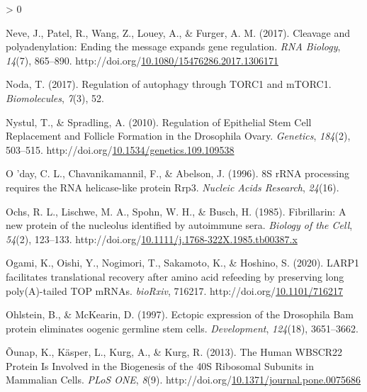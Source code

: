 \documentclass[12pt,oneside]{reedthesis}
\newlength{\cslhangindent}
\newenvironment{CSLReferences}[2] %
 {%
  \setlength{\parindent}{0pt}
  \ifodd #1 \everypar{\setlength{\hangindent}{\cslhangindent}}\ignorespaces\fi
  \ifnum #2 > 0
  \setlength{\parskip}{#2\baselineskip}
  \fi
 }%
 {}
\begin{document}
\begin{CSLReferences}{1}{0}
\leavevmode\hypertarget{ref-Neve2017i}{}%
Neve, J., Patel, R., Wang, Z., Louey, A., \& Furger, A. M. (2017). Cleavage and polyadenylation: {Ending} the message expands gene regulation. \emph{RNA Biology}, \emph{14}(7), 865--890. http://doi.org/\href{https://doi.org/10.1080/15476286.2017.1306171}{10.1080/15476286.2017.1306171}

\leavevmode\hypertarget{ref-Noda2017}{}%
Noda, T. (2017). Regulation of autophagy through {TORC1} and {mTORC1}. \emph{Biomolecules}, \emph{7}(3), 52.

\leavevmode\hypertarget{ref-nystulRegulationEpithelialStem2010}{}%
Nystul, T., \& Spradling, A. (2010). Regulation of {Epithelial Stem Cell Replacement} and {Follicle Formation} in the {Drosophila Ovary}. \emph{Genetics}, \emph{184}(2), 503--515. http://doi.org/\href{https://doi.org/10.1534/genetics.109.109538}{10.1534/genetics.109.109538}

\leavevmode\hypertarget{ref-oday8SRRNAProcessing1996}{}%
O 'day, C. L., Chavanikamannil, F., \& Abelson, J. (1996). {8S rRNA} processing requires the {RNA} helicase-like protein {Rrp3}. \emph{Nucleic Acids Research}, \emph{24}(16).

\leavevmode\hypertarget{ref-ochsFibrillarinNewProtein1985}{}%
Ochs, R. L., Lischwe, M. A., Spohn, W. H., \& Busch, H. (1985). Fibrillarin: A new protein of the nucleolus identified by autoimmune sera. \emph{Biology of the Cell}, \emph{54}(2), 123--133. http://doi.org/\href{https://doi.org/10.1111/j.1768-322X.1985.tb00387.x}{10.1111/j.1768-322X.1985.tb00387.x}

\leavevmode\hypertarget{ref-ogamiLARP1FacilitatesTranslational2020}{}%
Ogami, K., Oishi, Y., Nogimori, T., Sakamoto, K., \& Hoshino, S. (2020). {LARP1} facilitates translational recovery after amino acid refeeding by preserving long poly({A})-tailed {TOP mRNAs}. \emph{bioRxiv}, 716217. http://doi.org/\href{https://doi.org/10.1101/716217}{10.1101/716217}

\leavevmode\hypertarget{ref-ohlsteinEctopicExpressionDrosophila1997}{}%
Ohlstein, B., \& McKearin, D. (1997). Ectopic expression of the {Drosophila Bam} protein eliminates oogenic germline stem cells. \emph{Development}, \emph{124}(18), 3651--3662.

\leavevmode\hypertarget{ref-ounapHumanWBSCR22Protein2013}{}%
Õunap, K., Käsper, L., Kurg, A., \& Kurg, R. (2013). The {Human WBSCR22 Protein Is Involved} in the {Biogenesis} of the {40S Ribosomal Subunits} in {Mammalian Cells}. \emph{PLoS ONE}, \emph{8}(9). http://doi.org/\href{https://doi.org/10.1371/journal.pone.0075686}{10.1371/journal.pone.0075686}


\end{CSLReferences}
\end{document}
